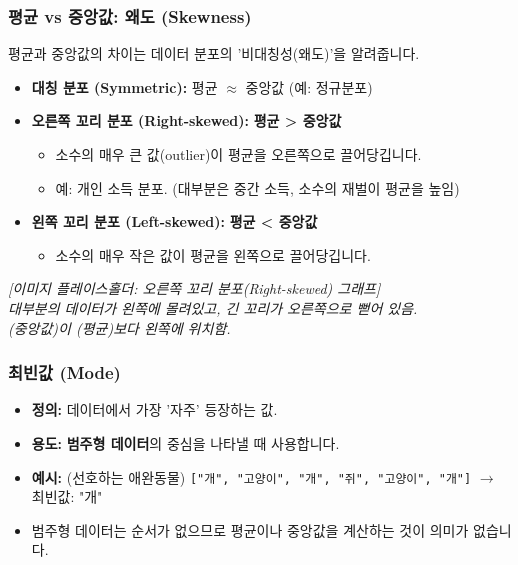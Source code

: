 \documentclass[11pt,a4paper]{book}
\theoremstyle{definition}
\begin{document}
\subsubsection{평균 vs 중앙값: 왜도 (Skewness)}

평균과 중앙값의 차이는 데이터 분포의 '비대칭성(왜도)'을 알려줍니다.

\begin{itemize}
    \item \textbf{대칭 분포 (Symmetric):} 평균 $\approx$ 중앙값 (예: 정규분포)
    \item \textbf{오른쪽 꼬리 분포 (Right-skewed):} \textbf{평균 > 중앙값}
    \begin{itemize}
        \item 소수의 매우 큰 값(outlier)이 평균을 오른쪽으로 끌어당깁니다.
        \item 예: 개인 소득 분포. (대부분은 중간 소득, 소수의 재벌이 평균을 높임)
    \end{itemize}
    \item \textbf{왼쪽 꼬리 분포 (Left-skewed):} \textbf{평균 < 중앙값}
    \begin{itemize}
        \item 소수의 매우 작은 값이 평균을 왼쪽으로 끌어당깁니다.
    \end{itemize}
\end{itemize}

\begin{center}
    \textit{[이미지 플레이스홀더: 오른쪽 꼬리 분포(Right-skewed) 그래프]} \\
    \textit{대부분의 데이터가 왼쪽에 몰려있고, 긴 꼬리가 오른쪽으로 뻗어 있음. \\
    (중앙값)이 (평균)보다 왼쪽에 위치함.}
\end{center}

\subsubsection{최빈값 (Mode)}

\begin{itemize}
    \item \textbf{정의:} 데이터에서 가장 '자주' 등장하는 값.
    \item \textbf{용도:} \textbf{범주형 데이터}의 중심을 나타낼 때 사용합니다.
    \item \textbf{예시:} (선호하는 애완동물) \texttt{["개", "고양이", "개", "쥐", "고양이", "개"]} $\rightarrow$ 최빈값: "개"
    \item 범주형 데이터는 순서가 없으므로 평균이나 중앙값을 계산하는 것이 의미가 없습니다.
\end{itemize}
\end{document}
